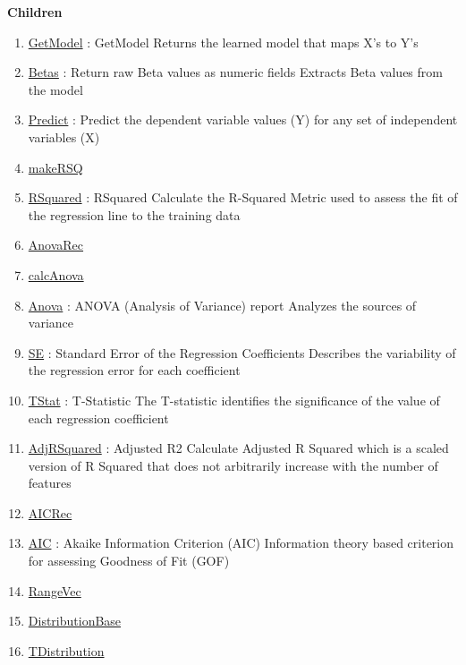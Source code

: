 \textbf{Children}
\begin{enumerate}
\item \hyperlink{ecldoc:linearregression.ols.getmodel}{GetModel}
: GetModel Returns the learned model that maps X's to Y's
\item \hyperlink{ecldoc:linearregression.ols.betas}{Betas}
: Return raw Beta values as numeric fields Extracts Beta values from the model
\item \hyperlink{ecldoc:linearregression.ols.predict}{Predict}
: Predict the dependent variable values (Y) for any set of independent variables (X)
\item \hyperlink{ecldoc:linearregression.ols.makersq}{makeRSQ}
\item \hyperlink{ecldoc:linearregression.ols.rsquared}{RSquared}
: RSquared Calculate the R-Squared Metric used to assess the fit of the regression line to the training data
\item \hyperlink{ecldoc:linearregression.ols.anovarec}{AnovaRec}
\item \hyperlink{ecldoc:linearregression.ols.calcanova}{calcAnova}
\item \hyperlink{ecldoc:linearregression.ols.anova}{Anova}
: ANOVA (Analysis of Variance) report Analyzes the sources of variance
\item \hyperlink{ecldoc:linearregression.ols.se}{SE}
: Standard Error of the Regression Coefficients Describes the variability of the regression error for each coefficient
\item \hyperlink{ecldoc:linearregression.ols.tstat}{TStat}
: T-Statistic The T-statistic identifies the significance of the value of each regression coefficient
\item \hyperlink{ecldoc:linearregression.ols.adjrsquared}{AdjRSquared}
: Adjusted R2 Calculate Adjusted R Squared which is a scaled version of R Squared that does not arbitrarily increase with the number of features
\item \hyperlink{ecldoc:linearregression.ols.aicrec}{AICRec}
\item \hyperlink{ecldoc:linearregression.ols.aic}{AIC}
: Akaike Information Criterion (AIC) Information theory based criterion for assessing Goodness of Fit (GOF)
\item \hyperlink{ecldoc:linearregression.ols.rangevec}{RangeVec}
\item \hyperlink{ecldoc:linearregression.ols.distributionbase}{DistributionBase}
\item \hyperlink{ecldoc:linearregression.ols.tdistribution}{TDistribution}

\end{enumerate}
